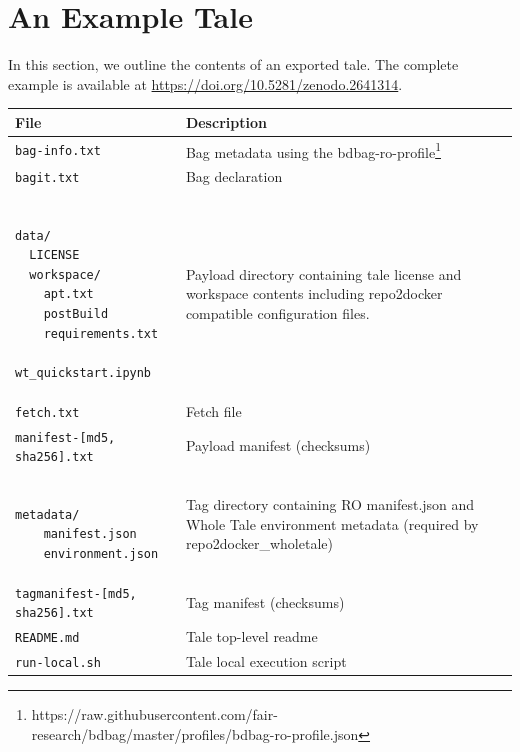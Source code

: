 \documentclass[conference]{IEEEtran}
\begin{document}
\section{An Example Tale} \label{example}

In this section, we outline the contents of an exported tale. The complete example is available at \href{https://doi.org/10.5281/zenodo.2641314}{https://doi.org/10.5281/zenodo.2641314}.


\begin{center}
\begin{footnotesize}
\begin{tabular}{| p{3.5cm}|p{4.5cm} | } \hline
{\bf File} & {\bf Description}  \\ \hline
\texttt{bag-info.txt} & Bag metadata using the bdbag-ro-profile\footnote{https://raw.githubusercontent.com/fair-research/bdbag/master/profiles/bdbag-ro-profile.json} \\ \hline
\texttt{bagit.txt} & Bag declaration \\ \hline
\begin{minipage}{3in}
\begin{scriptsize}
\begin{verbatim}

data/
  LICENSE
  workspace/
    apt.txt
    postBuild
    requirements.txt
    wt_quickstart.ipynb
\end{verbatim}
\end{scriptsize}
\end{minipage} & Payload directory containing tale license and workspace contents including repo2docker compatible configuration files. \\ \hline
\texttt{\texttt{fetch.txt}} & Fetch file \\ \hline
\texttt{manifest-[md5, sha256].txt} & Payload manifest (checksums) \\ \hline
\begin{minipage}{3in}
\begin{scriptsize}
\begin{verbatim}

metadata/
    manifest.json
    environment.json
\end{verbatim}
\end{scriptsize}
\end{minipage} & Tag directory containing RO manifest.json and Whole Tale environment metadata  (required by repo2docker\_wholetale) \\ \hline
\texttt{tagmanifest-[md5, sha256].txt} & Tag manifest (checksums) \\ \hline
\texttt{README.md} & Tale top-level readme \\ \hline
\texttt{run-local.sh} & Tale local execution script \\ \hline
\end{tabular}
\end{footnotesize}
\end{center}
\end{document}
